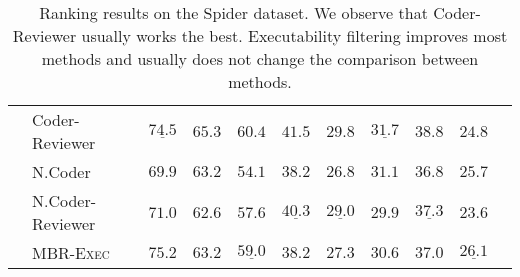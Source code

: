 \documentclass[nohyperref]{article}
\theoremstyle{plain}
\theoremstyle{definition}
\theoremstyle{remark}
\begin{document}
\begin{table*}[]
\begin{tabular}{l|lccccccccc}
    & Coder-Reviewer &  $\underline{74.5}$ &     $\mathbf{65.3}$ &     $\mathbf{60.4}$ &     $\mathbf{41.5}$ &     $\mathbf{29.8}$ &  $\underline{31.7}$ &     $\mathbf{38.8}$ &              $24.8$ \\
\cmidrule{2-10}
    & N.Coder &              $69.9$ &              $63.2$ &              $54.1$ &              $38.2$ &              $26.8$ &              $31.1$ &              $36.8$ &              $25.7$ \\
    & N.Coder-Reviewer &              $71.0$ &              $62.6$ &              $57.6$ &  $\underline{40.3}$ &  $\underline{29.0}$ &              $29.9$ &  $\underline{37.3}$ &              $23.6$ \\
\cmidrule{2-10}
    & MBR-\textsc{Exec} &     $\mathbf{75.2}$ &              $63.2$ &  $\underline{59.0}$ &              $38.2$ &              $27.3$ &              $30.6$ &              $37.0$ &  $\underline{26.1}$ \\
\bottomrule
\end{tabular}
 \caption{
Ranking results on the Spider dataset. We observe that Coder-Reviewer usually works the best. Executability filtering improves most methods and usually does not change the comparison between methods.
}
\label{tab:app_spider_exec}
\end{table*} 
\end{document}
